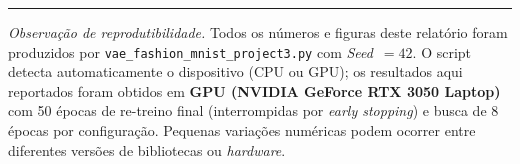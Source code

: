 \documentclass[11pt,a4paper]{article}
\begin{document}
\vspace{0.6em}
\hrule
\vspace{0.4em}
{\footnotesize \textit{Observação de reprodutibilidade.} Todos os números e figuras deste relatório foram produzidos por \texttt{vae\_fashion\_mnist\_project3.py} com \textit{Seed}~$=42$. O script detecta automaticamente o dispositivo (CPU ou GPU); os resultados aqui reportados foram obtidos em \textbf{GPU (NVIDIA GeForce RTX 3050 Laptop)} com 50 épocas de re-treino final (interrompidas por \textit{early stopping}) e busca de 8 épocas por configuração. Pequenas variações numéricas podem ocorrer entre diferentes versões de bibliotecas ou \textit{hardware}.}
\end{document}
